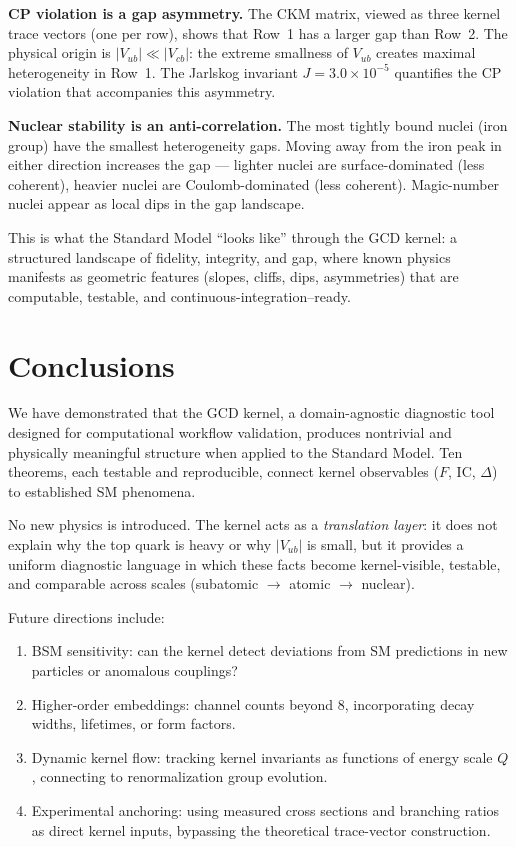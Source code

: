 \documentclass[
  aps,
  prd,
  twocolumn,
  superscriptaddress,
  nofootinbib,
  floatfix
]{revtex4-2}
\newcommand{\IC}{\mathrm{IC}}
\begin{document}
\textbf{CP violation is a gap asymmetry.}  The CKM matrix,
viewed as three kernel trace vectors (one per row), shows
that Row~1 has a larger gap than Row~2.  The physical origin
is $|V_{ub}| \ll |V_{cb}|$: the extreme smallness of $V_{ub}$
creates maximal heterogeneity in Row~1.  The Jarlskog
invariant $J = 3.0 \times 10^{-5}$ quantifies the CP
violation that accompanies this asymmetry.

\textbf{Nuclear stability is an anti-correlation.}  The most
tightly bound nuclei (iron group) have the smallest heterogeneity
gaps.  Moving away from the iron peak in either direction
increases the gap --- lighter nuclei are surface-dominated
(less coherent), heavier nuclei are Coulomb-dominated
(less coherent).  Magic-number nuclei appear as local
dips in the gap landscape.

This is what the Standard Model ``looks like'' through the
GCD kernel: a structured landscape of fidelity, integrity,
and gap, where known physics manifests as geometric features
(slopes, cliffs, dips, asymmetries) that are computable,
testable, and continuous-integration--ready.

\section{Conclusions}\label{sec:conclusions}

We have demonstrated that the GCD kernel, a domain-agnostic
diagnostic tool designed for computational workflow validation,
produces nontrivial and physically meaningful structure when
applied to the Standard Model.  Ten theorems, each testable
and reproducible, connect kernel observables ($F$, $\IC$,
$\Delta$) to established SM phenomena.

No new physics is introduced.  The kernel acts as a
\emph{translation layer}: it does not explain why the top
quark is heavy or why $|V_{ub}|$ is small, but it provides
a uniform diagnostic language in which these facts become
kernel-visible, testable, and comparable across scales
(subatomic $\to$ atomic $\to$ nuclear).

Future directions include:
\begin{enumerate}
\item BSM sensitivity: can the kernel detect deviations
  from SM predictions in new particles or anomalous couplings?
\item Higher-order embeddings: channel counts beyond 8,
  incorporating decay widths, lifetimes, or form factors.
\item Dynamic kernel flow: tracking kernel invariants as
  functions of energy scale $Q$, connecting to renormalization
  group evolution.
\item Experimental anchoring: using measured cross sections
  and branching ratios as direct kernel inputs, bypassing
  the theoretical trace-vector construction.
\end{enumerate}
\end{document}
